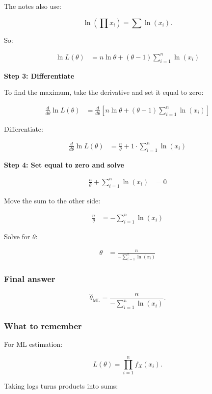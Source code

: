 \documentclass[10pt]{article}
\begin{document}
The notes also use:

\[
\ln\left(\prod x_i\right)
=
\sum \ln(x_i).
\]

So:

\begin{align*}
\ln L(\theta)
&=
n\ln\theta
+(\theta-1)
\sum_{i=1}^n \ln(x_i)
\end{align*}

\textbf{Step 3: Differentiate}

To find the maximum, take the derivative and set it equal to zero:

\begin{align*}
\frac{d}{d\theta}\ln L(\theta)
&=
\frac{d}{d\theta}
\left[
n\ln\theta
+(\theta-1)
\sum_{i=1}^n \ln(x_i)
\right]
\end{align*}

Differentiate:

\begin{align*}
\frac{d}{d\theta}\ln L(\theta)
&=
\frac{n}{\theta}
+1\cdot
\sum_{i=1}^n \ln(x_i)
\end{align*}

\textbf{Step 4: Set equal to zero and solve}

\begin{align*}
\frac{n}{\theta}
+\sum_{i=1}^n \ln(x_i)
&=0
\end{align*}

Move the sum to the other side:

\begin{align*}
\frac{n}{\theta}
&=
-\sum_{i=1}^n \ln(x_i)
\end{align*}

Solve for $\theta$:

\begin{align*}
\theta
&=
\frac{n}
{-\sum_{i=1}^n \ln(x_i)}
\end{align*}

\subsubsection*{Final answer}
\[
\hat{\theta}_{\mathrm{ML}}
=
\frac{n}
{-\sum_{i=1}^n \ln(x_i)}.
\]

\subsubsection*{What to remember}
For ML estimation:

\[
L(\theta)=
\prod_{i=1}^n f_X(x_i).
\]

Taking logs turns products into sums:
\end{document}
